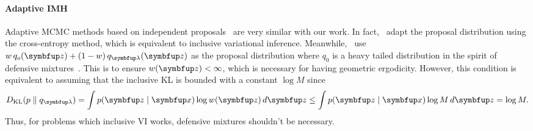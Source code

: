 \paragraph{Adaptive IMH}
Adaptive MCMC methods based on independent proposals~\citep{keith_adaptive_2008, holden_adaptive_2009, giordani_adaptive_2010} are very similar with our work.
In fact,~\citet{keith_adaptive_2008} adapt the proposal distribution using the cross-entropy method, which is equivalent to inclusive variational inference.
Meanwhile,~\citet{giordani_adaptive_2010} use \(w\,q_o(\vz) + (1-w)\,q_{\vlambda}(\vz)\) as the proposal distribution where \(q_0\) is a heavy tailed distribution in the spirit of defensive mixtures~\citep{hesterberg_weighted_1995}.
This is to ensure \(w(\vz) < \infty\), which is necessary for having geometric ergodicity.
However, this condition is equivalent to assuming that the inclusive KL is bounded with a constant \(\log M\) since
\begin{align}
  \DKL{p}{q_{\vlambda}} = \int p(\vz\mid\vx) \log w(\vz)\,d\vz \leq \int p(\vz\mid\vx) \log M \, d\vz = \log M.
\end{align}
Thus, for problems which inclusive VI works, defensive mixtures shouldn't be necessary.

